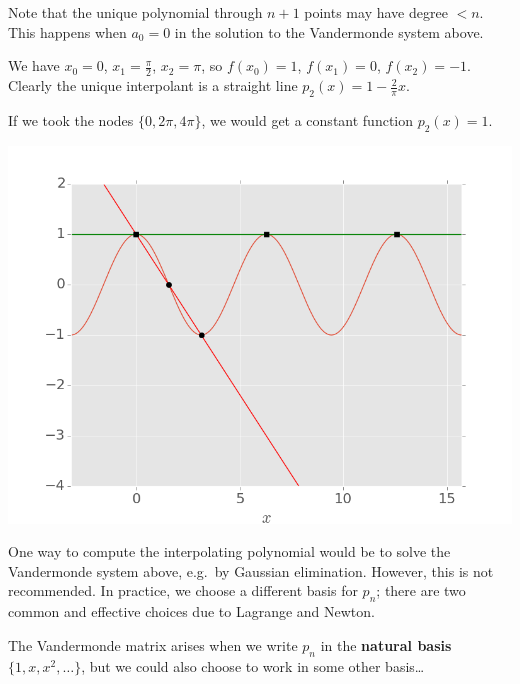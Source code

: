 \documentclass[
  letterpaper,
  DIV=11,
  numbers=noendperiod]{scrreprt}
\begin{document}
\begin{tcolorbox}[enhanced jigsaw, toptitle=1mm, breakable, colbacktitle=quarto-callout-note-color!10!white, colback=white, opacitybacktitle=0.6, rightrule=.15mm, bottomrule=.15mm, left=2mm, arc=.35mm, bottomtitle=1mm, title=\textcolor{quarto-callout-note-color}{\faInfo}\hspace{0.5em}{Note}, titlerule=0mm, toprule=.15mm, leftrule=.75mm, opacityback=0, colframe=quarto-callout-note-color-frame, coltitle=black]

Note that the unique polynomial through \(n+1\) points may have degree
\(< n\). This happens when \(a_0=0\) in the solution to the Vandermonde
system above.

\end{tcolorbox}

We have \(x_0=0\), \(x_1=\tfrac{\pi}{2}\), \(x_2=\pi\), so \(f(x_0)=1\),
\(f(x_1)=0\), \(f(x_2)=-1\). Clearly the unique interpolant is a
straight line \(p_2(x) = 1 - \tfrac2\pi x\).

If we took the nodes \(\{0,2\pi,4\pi\}\), we would get a constant
function \(p_2(x)=1\).

\begin{center}
\includegraphics[width=0.7\linewidth,height=\textheight,keepaspectratio]{im/linear_interp.png}
\end{center}

One way to compute the interpolating polynomial would be to solve the
Vandermonde system above, e.g.~by Gaussian elimination. However, this is
not recommended. In practice, we choose a different basis for \(p_n\);
there are two common and effective choices due to Lagrange and Newton.

\begin{tcolorbox}[enhanced jigsaw, toptitle=1mm, breakable, colbacktitle=quarto-callout-note-color!10!white, colback=white, opacitybacktitle=0.6, rightrule=.15mm, bottomrule=.15mm, left=2mm, arc=.35mm, bottomtitle=1mm, title=\textcolor{quarto-callout-note-color}{\faInfo}\hspace{0.5em}{Note}, titlerule=0mm, toprule=.15mm, leftrule=.75mm, opacityback=0, colframe=quarto-callout-note-color-frame, coltitle=black]

The Vandermonde matrix arises when we write \(p_n\) in the
\textbf{natural basis} \(\{1,x,x^2,\ldots\}\), but we could also choose
to work in some other basis\ldots{}

\end{tcolorbox}
\end{document}
